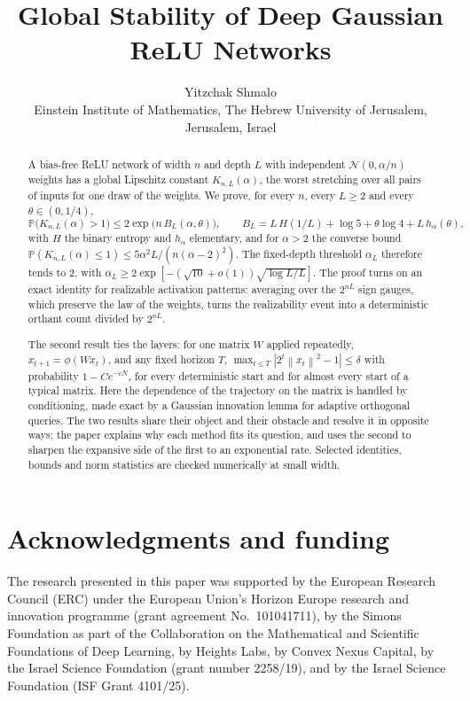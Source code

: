 \documentclass[11pt,a4paper]{article}
\title{Global Stability of Deep Gaussian ReLU Networks}
\author{Yitzchak Shmalo\\[3pt]
\small Einstein Institute of Mathematics, The Hebrew University of Jerusalem, Jerusalem, Israel\\
\small }
\date{}
\theoremstyle{definition}
\theoremstyle{remark}
\newcommand{\PP}{\mathbb{P}}
\newcommand{\norm}[1]{\left\lVert #1\right\rVert}
\begin{document}
\maketitle

\begin{abstract}
A bias-free ReLU network of width $n$ and depth $L$ with independent $\mathcal N(0,\alpha/n)$ weights has a global Lipschitz constant $K_{n,L}(\alpha)$, the worst stretching over all pairs of inputs for one draw of the weights. We prove, for every $n$, every $L\ge2$ and every $\theta\in(0,1/4)$,
\[
\PP\bigl(K_{n,L}(\alpha)>1\bigr)\le2\exp\!\bigl(n\,B_L(\alpha,\theta)\bigr),\qquad B_L=L\,H(1/L)+\log5+\theta\log4+L\,h_\alpha(\theta),
\]
with $H$ the binary entropy and $h_\alpha$ elementary, and for $\alpha>2$ the converse bound $\PP(K_{n,L}(\alpha)\le1)\le5\alpha^2L/(n(\alpha-2)^2)$. The fixed-depth threshold $\alpha_L$ therefore tends to $2$, with $\alpha_L\ge2\exp[-(\sqrt{10}+o(1))\sqrt{\log L/L}]$. The proof turns on an exact identity for realizable activation patterns: averaging over the $2^{nL}$ sign gauges, which preserve the law of the weights, turns the realizability event into a deterministic orthant count divided by $2^{nL}$.

The second result ties the layers: for one matrix $W$ applied repeatedly, $x_{t+1}=\phi(Wx_t)$, and any fixed horizon $T$, $\max_{t\le T}|2^t\norm{x_t}^2-1|\le\delta$ with probability $1-Ce^{-cN}$, for every deterministic start and for almost every start of a typical matrix. Here the dependence of the trajectory on the matrix is handled by conditioning, made exact by a Gaussian innovation lemma for adaptive orthogonal queries. The two results share their object and their obstacle and resolve it in opposite ways; the paper explains why each method fits its question, and uses the second to sharpen the expansive side of the first to an exponential rate. Selected identities, bounds and norm statistics are checked numerically at small width.
\end{abstract}

\tableofcontents












\section*{Acknowledgments and funding}
The research presented in this paper was supported by the European Research Council (ERC) under the European Union's Horizon Europe research and innovation programme (grant agreement No.~101041711), by the Simons Foundation as part of the Collaboration on the Mathematical and Scientific Foundations of Deep Learning, by Heights Labs, by Convex Nexus Capital, by the Israel Science Foundation (grant number 2258/19), and by the Israel Science Foundation (ISF Grant 4101/25).
\end{document}
